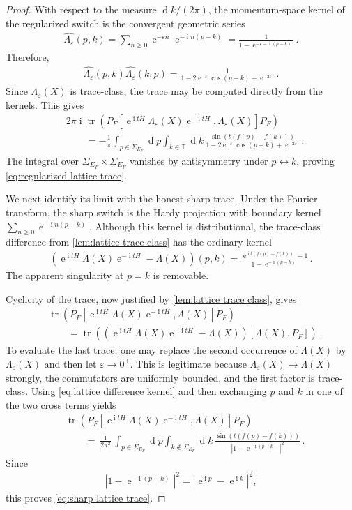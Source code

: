 \documentclass[10pt,a4paper]{amsart}
\newcommand{\TT}{\mathbb{T}}
\newcommand{\dif}{\operatorname{d}\!} %
\newcommand{\ee}{\operatorname{e}}
\newcommand{\eq}[1]{\begin{align*}#1\end{align*}}
\newcommand{\eql}[1]{\begin{align}#1\end{align}}
\newcommand{\ii}{\operatorname{i}}
\newcommand{\tr}{\operatorname{tr}}
\newcommand{\ve}{\varepsilon}
\begin{document}
\begin{proof}
With respect to the measure $\dif{k}/(2\pi)$, the momentum-space kernel of
the regularized switch is the convergent geometric series
\eq{\widehat{\Lambda_\ve}(p,k)
=
\sum_{n\geq0}\ee^{-\ve n}\ee^{-\ii n(p-k)}
=
\frac{1}{1-\ee^{-\ve-\ii(p-k)}}\,.}
Therefore,
\eq{\widehat{\Lambda_\ve}(p,k)
\widehat{\Lambda_\ve}(k,p)
=
\frac{1}
{1-2\ee^{-\ve}\cos(p-k)+\ee^{-2\ve}}\,.}
Since $\Lambda_\ve(X)$ is trace-class, the trace may be computed directly
from the kernels. This gives
\eq{&2\pi\ii\tr\left(
P_F\left[
\ee^{\ii tH}\Lambda_\ve(X)\ee^{-\ii tH},
\Lambda_\ve(X)
\right]P_F
\right)\\
&\qquad=
-\frac{1}{\pi}
\int_{p\in\Sigma_{E_F}}\dif{p}
\int_{k\in\TT}\dif{k}\,
\frac{\sin\left(t(f(p)-f(k))\right)}
{1-2\ee^{-\ve}\cos(p-k)+\ee^{-2\ve}}\,.}
The integral over $\Sigma_{E_F}\times\Sigma_{E_F}$ vanishes by antisymmetry
under $p\leftrightarrow k$, proving
\cref{eq:regularized lattice trace}.

We next identify its limit with the honest sharp trace. Under the Fourier
transform, the sharp switch is the Hardy projection with boundary kernel
$\sum_{n\geq0}\ee^{-\ii n(p-k)}$. Although this kernel is distributional,
the trace-class difference from \cref{lem:lattice trace class} has the
ordinary kernel
\eql{\left(
\ee^{\ii tH}\Lambda(X)\ee^{-\ii tH}-\Lambda(X)
\right)(p,k)
=
\frac{\ee^{\ii t(f(p)-f(k))}-1}
{1-\ee^{-\ii(p-k)}}\,.
\label{eq:lattice difference kernel}}
The apparent singularity at $p=k$ is removable.

Cyclicity of the trace, now justified by
\cref{lem:lattice trace class}, gives
\eq{&\tr\left(
P_F\left[
\ee^{\ii tH}\Lambda(X)\ee^{-\ii tH},\Lambda(X)
\right]P_F
\right)\\
&\qquad=
\tr\left(
\left(
\ee^{\ii tH}\Lambda(X)\ee^{-\ii tH}-\Lambda(X)
\right)
[\Lambda(X),P_F]
\right)\,.}
To evaluate the last trace, one may replace the second occurrence of
$\Lambda(X)$ by $\Lambda_\ve(X)$ and then let $\ve\to0^+$. This is legitimate
because $\Lambda_\ve(X)\to\Lambda(X)$ strongly, the commutators are uniformly
bounded, and the first factor is trace-class. Using
\cref{eq:lattice difference kernel} and then exchanging $p$ and $k$ in one
of the two cross terms yields
\eq{&\tr\left(
P_F\left[
\ee^{\ii tH}\Lambda(X)\ee^{-\ii tH},\Lambda(X)
\right]P_F
\right)\\
&\qquad=
\frac{\ii}{2\pi^2}
\int_{p\in\Sigma_{E_F}}\dif{p}
\int_{k\notin\Sigma_{E_F}}\dif{k}\,
\frac{\sin\left(t(f(p)-f(k))\right)}
{\left|1-\ee^{-\ii(p-k)}\right|^2}\,.}
Since
\eq{\left|1-\ee^{-\ii(p-k)}\right|^2
=\left|\ee^{\ii p}-\ee^{\ii k}\right|^2,}
this proves \cref{eq:sharp lattice trace}.


\end{proof}
\end{document}
